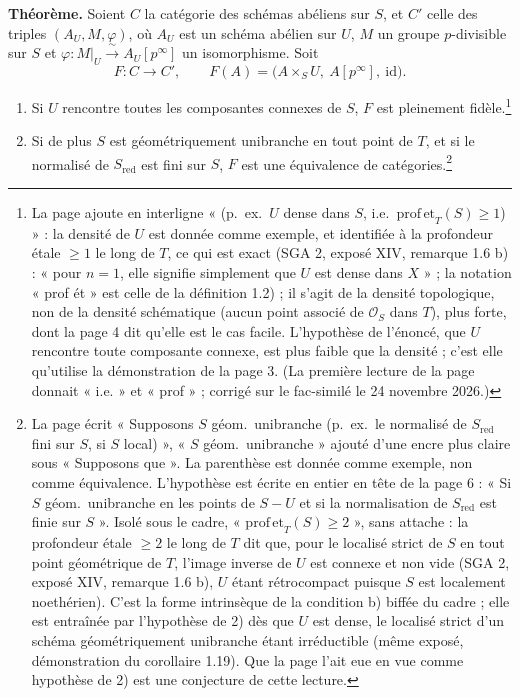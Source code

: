 \documentclass[11pt,a4paper]{article}
\begin{document}
\textbf{Théorème.} Soient $C$ la catégorie des schémas abéliens sur $S$, et
$C'$ celle des triples $(A_U, M, \varphi)$, où $A_U$ est un schéma abélien sur
$U$, $M$ un groupe $p$-divisible sur $S$ et
$\varphi : M|_U \xrightarrow{\ \sim\ } A_U[p^\infty]$ un isomorphisme. Soit
\[
  F : C \longrightarrow C', \qquad
  F(A) = \bigl(A \times_S U,\ A[p^\infty],\ \mathrm{id}\bigr).
\]
\begin{enumerate}
  \item[1)] Si $U$ rencontre toutes les composantes connexes de $S$, $F$ est
  pleinement fidèle.\footnote{La page ajoute en interligne « (p.\ ex.\ $U$ dense
  dans $S$, i.e.\ $\mathrm{prof\,et}_T(S) \geq 1$) » : la densité de $U$ est
  donnée comme exemple, et identifiée à la profondeur étale $\geq 1$ le long
  de $T$, ce qui est exact (SGA 2, exposé XIV, remarque 1.6 b) : « pour
  $n = 1$, elle signifie simplement que $U$ est dense dans $X$ » ; la
  notation « prof ét » est celle de la définition 1.2) ; il s'agit de la densité
  topologique, non de la densité schématique (aucun point associé de
  $\mathcal{O}_S$ dans $T$), plus forte, dont la page 4 dit qu'elle est le cas
  facile. L'hypothèse de l'énoncé, que $U$ rencontre toute composante
  connexe, est plus faible que la densité ; c'est elle qu'utilise la
  démonstration de la page 3. (La première lecture de la page donnait
  « i.e. » et « prof » ; corrigé sur le fac-similé le 24 novembre 2026.)}
  \item[2)] Si de plus $S$ est géométriquement unibranche en tout point de
  $T$, et si le normalisé de $S_{\mathrm{red}}$ est fini sur $S$, $F$ est une
  équivalence de catégories.\footnote{La page écrit « Supposons $S$ géom.\
  unibranche (p.\ ex.\ le normalisé de $S_{\mathrm{red}}$ fini sur $S$, si $S$
  local) », « $S$ géom.\ unibranche » ajouté d'une encre plus claire sous
  « Supposons que ». La parenthèse est donnée comme exemple, non comme
  équivalence. L'hypothèse est écrite en entier en tête de la
  page 6 : « Si $S$ géom.\ unibranche en les points de $S - U$ et si la
  normalisation de $S_{\mathrm{red}}$ est finie sur $S$ ». Isolé sous le
  cadre, « $\mathrm{prof\,et}_T(S) \geq 2$ », sans attache : la profondeur
  étale $\geq 2$ le long de $T$ dit que, pour le localisé strict de $S$ en
  tout point géométrique de $T$, l'image inverse de $U$ est connexe et non
  vide (SGA 2, exposé XIV, remarque 1.6 b), $U$ étant rétrocompact puisque
  $S$ est localement noethérien). C'est la forme intrinsèque de la condition
  b) biffée du cadre ; elle est entraînée par l'hypothèse de 2) dès que $U$
  est dense, le localisé strict d'un schéma géométriquement unibranche étant
  irréductible (même exposé, démonstration du corollaire 1.19). Que la page
  l'ait eue en vue comme hypothèse de 2) est une conjecture de cette
  lecture.}
\end{enumerate}
\end{document}
